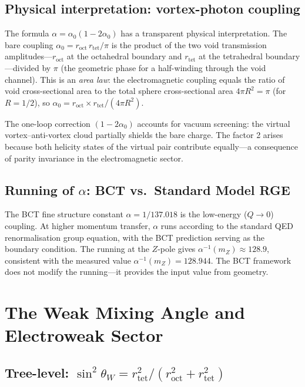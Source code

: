 \documentclass[review,number,sort&compress]{elsarticle}
\newcommand{\roct}{r_{\mathrm{oct}}}
\newcommand{\rtet}{r_{\mathrm{tet}}}
\newcommand{\azero}{\alpha_0}
\begin{document}
\subsection{Physical interpretation: vortex-photon coupling}

The formula $\alpha = \azero(1 - 2\azero)$ has a transparent physical
interpretation. The bare coupling $\azero = \roct\,\rtet/\pi$ is
the product of the two void transmission amplitudes---$\roct$ at the
octahedral boundary and $\rtet$ at the tetrahedral boundary---divided
by $\pi$ (the geometric phase for a half-winding through the void channel).
This is an \textit{area law}: the electromagnetic coupling equals the
ratio of void cross-sectional area to the total sphere cross-sectional
area $4\pi R^2 = \pi$ (for $R = 1/2$), so
$\alpha_0 = \roct \times \rtet / (4\pi R^2)$.

The one-loop correction $(1 - 2\azero)$ accounts for vacuum screening:
the virtual vortex--anti-vortex cloud partially shields the bare charge.
The factor 2 arises because both helicity states of the virtual pair
contribute equally---a consequence of parity invariance in the
electromagnetic sector.

\subsection{Running of $\alpha$: BCT vs.\ Standard Model RGE}

The BCT fine structure constant $\alpha = 1/137.018$ is the
low-energy ($Q \to 0$) coupling. At higher momentum transfer, $\alpha$
runs according to the standard QED renormalisation group equation,
with the BCT prediction serving as the boundary condition. The running
at the $Z$-pole gives $\alpha^{-1}(m_Z) \approx 128.9$, consistent
with the measured value $\alpha^{-1}(m_Z) = 128.944$. The BCT framework
does not modify the running---it provides the input value from geometry.

\section{The Weak Mixing Angle and Electroweak Sector}
\label{sec:electroweak}

\subsection{Tree-level: $\sin^2\theta_W = \rtet^2/(\roct^2 + \rtet^2)$}
\end{document}
